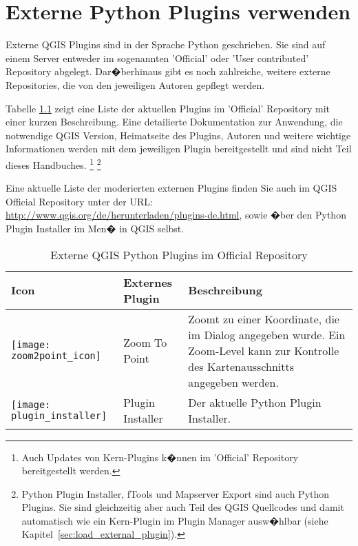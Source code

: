 
\chapter{Externe Python Plugins verwenden}\label{sec:external_plugins}


Externe QGIS Plugins sind in der Sprache Python geschrieben. Sie sind auf
einem Server entweder im sogenannten 'Official' oder 'User contributed'
Repository abgelegt. Dar�berhinaus gibt es noch zahlreiche, weitere externe
Repositories, die von den jeweiligen Autoren gepflegt werden. 

Tabelle \ref{tab:external_plugins} zeigt
eine Liste der aktuellen Plugins im 'Official' Repository mit einer kurzen
Beschreibung. Eine detailierte Dokumentation zur Anwendung, die notwendige
QGIS Version, Heimatseite des Plugins, Autoren und weitere wichtige
Informationen werden mit dem jeweiligen Plugin bereitgestellt und sind nicht
Teil dieses Handbuches. \footnote{Auch Updates von Kern-Plugins k�nnen im
'Official' Repository bereitgestellt werden.}
\footnote{Python Plugin Installer, fTools und Mapserver Export sind auch
Python Plugins. Sie sind gleichzeitig aber auch Teil des QGIS Quellcodes und
damit automatisch wie ein Kern-Plugin im Plugin Manager ausw�hlbar (siehe
Kapitel~\ref{sec:load_external_plugin}).}

Eine aktuelle Liste der moderierten externen Plugins finden Sie auch im QGIS
Official Repository unter der URL:
\url{http://www.qgis.org/de/herunterladen/plugins-de.html}, sowie �ber den
Python Plugin Installer im Men�  in QGIS selbst. 

\begin{table}[H]
\centering
\caption{Externe QGIS Python Plugins im Official Repository}\label{tab:external_plugins}\medskip
\small
 \begin{tabular}{|l|l|p{4in}|}
\hline \textbf{Icon} & \textbf{Externes Plugin} & \textbf{Beschreibung}\\
\hline
\texttt{[image: zoom2point\_icon]}
 & Zoom To Point \index{Plugins!Zoom To Point} & Zoomt zu einer Koordinate,
die im Dialog angegeben wurde. Ein Zoom-Level kann zur Kontrolle des
Kartenausschnitts angegeben werden. \\
\hline
\texttt{[image: plugin\_installer]}
& Plugin Installer \index{Plugins!Python Plugin Installer} & Der aktuelle
Python Plugin Installer. \\
\hline
\end{tabular}
\end{table}

